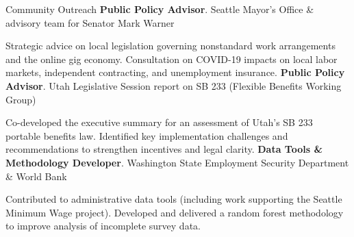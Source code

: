 \begin{rubric}{Community Outreach}
%
    \textbf{Public Policy Advisor}. Seattle Mayor's Office \& advisory team for Senator Mark Warner
    \par Strategic advice on local legislation governing nonstandard work arrangements and the online gig economy. Consultation on COVID-19 impacts on local labor markets, independent contracting, and unemployment insurance.
%
    \textbf{Public Policy Advisor}. Utah Legislative Session report on SB 233 (Flexible Benefits Working Group)
    \par Co-developed the executive summary for an assessment of Utah's SB 233 portable benefits law. Identified key implementation challenges and recommendations to strengthen incentives and legal clarity.
%
    \textbf{Data Tools \& Methodology Developer}. Washington State Employment Security Department \& World Bank
    \par Contributed to administrative data tools (including work supporting the Seattle Minimum Wage project). Developed and delivered a random forest methodology to improve analysis of incomplete survey data.
\end{rubric}
